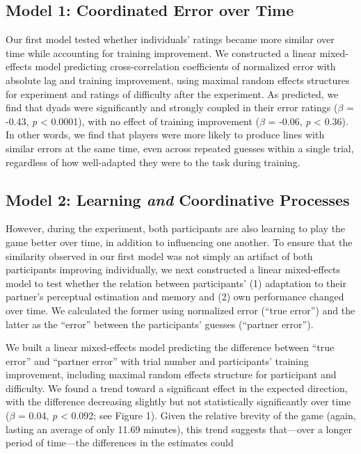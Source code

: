 \documentclass[10pt, letterpaper]{article}
\begin{document}
\subsection{Model 1: Coordinated Error over
Time}\label{model-1-coordinated-error-over-time}

Our first model tested whether individuals' ratings became more similar
over time while accounting for training improvement. We constructed a
linear mixed-effects model predicting cross-correlation coefficients of
normalized error with absolute lag and training improvement, using
maximal random effects structures for experiment and ratings of
difficulty after the experiment. As predicted, we find that dyads were
significantly and strongly coupled in their error ratings
(\emph{\(\beta\)} = -0.43, \emph{p} \textless{} 0.0001), with no effect
of training improvement (\emph{\(\beta\)} = -0.06, \emph{p} \textless{}
0.36). In other words, we find that players were more likely to produce
lines with similar errors at the same time, even across repeated guesses
within a single trial, regardless of how well-adapted they were to the
task during training.

\subsection{\texorpdfstring{Model 2: Learning \emph{and} Coordinative
Processes}{Model 2: Learning and Coordinative Processes}}\label{model-2-learning-and-coordinative-processes}

However, during the experiment, both participants are also learning to
play the game better over time, in addition to influencing one another.
To ensure that the similarity observed in our first model was not simply
an artifact of both participants improving individually, we next
constructed a linear mixed-effects model to test whether the relation
between participants' (1) adaptation to their partner's perceptual
estimation and memory and (2) own performance changed over time. We
calculated the former using normalized error (``true error'') and the
latter as the ``error'' between the participants' guesses (``partner
error'').

We built a linear mixed-effects model predicting the difference between
``true error'' and ``partner error'' with trial number and participants'
training improvement, including maximal random effects structure for
participant and difficulty. We found a trend toward a significant effect
in the expected direction, with the difference decreasing slightly but
not statistically significantly over time (\emph{\(\beta\)} = 0.04,
\emph{p} \textless{} 0.092; see Figure 1). Given the relative brevity of
the game (again, lasting an average of only 11.69 minutes), this trend
suggests that---over a longer period of time---the differences in the
estimates could
\end{document}

